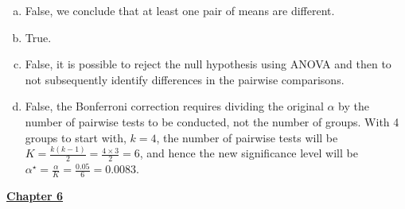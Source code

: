 \documentclass[11pt]{article}
\begin{document}
\begin{enumerate}
\begin{enumerate}[(a)]
\item False, we conclude that at least one pair of means are different.
\item True.
\item False, it is possible to reject the null hypothesis using ANOVA and then to not subsequently identify differences in the pairwise comparisons.
\item False, the Bonferroni correction requires dividing the original $\alpha$ by the number of pairwise tests to be conducted, not the number of groups. With 4 groups to start with, $k = 4$, the number of pairwise tests will be $K = \frac{k(k-1)}{2} = \frac{4 \times 3}{2} = 6$, and hence the new significance level will be $\alpha^\star = \frac{\alpha}{K} = \frac{0.05}{6} = 0.0083$.
\end{enumerate}

%

\end{enumerate}

%

\pagebreak

{\large \textbf{\underline{Chapter 6}}}
\end{document}
